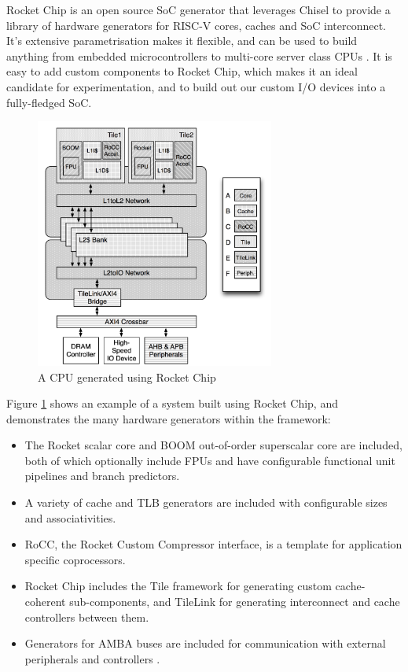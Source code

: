 \documentclass[a4paper,fleqn,12pt]{article}
\begin{document}
Rocket Chip is an open source SoC generator that leverages Chisel to provide a library of hardware generators for RISC-V cores, caches and SoC interconnect. It's extensive parametrisation makes it flexible, and can be used to build anything from embedded microcontrollers to multi-core server class CPUs \citep{rocketchip}. It is easy to add custom components to Rocket Chip, which makes it an ideal candidate for experimentation, and to build out our custom I/O devices into a fully-fledged SoC.


\begin{figure}[h!]
	\centering
	\includegraphics[width=0.7\textwidth]{../img/rocket-chip.png}
	\caption{A CPU generated using Rocket Chip \citep{rocketchip}}
	\label{fig:rocket}
\end{figure}


Figure \ref{fig:rocket} shows an example of a system built using Rocket Chip, and demonstrates the many hardware generators within the framework:

\begin{itemize}
	\item The Rocket scalar core and BOOM out-of-order superscalar core are included, both of which optionally include FPUs and have configurable functional unit pipelines and branch predictors.
	\item A variety of cache and TLB generators are included with configurable sizes and associativities.
	\item RoCC, the Rocket Custom Compressor interface, is a template for application specific coprocessors.
	\item Rocket Chip includes the Tile framework for generating custom cache-coherent sub-components, and TileLink for generating interconnect and cache controllers between them.
	\item Generators for AMBA buses are included for communication with external peripherals and controllers \citep{axi}.
\end{itemize}
\end{document}
